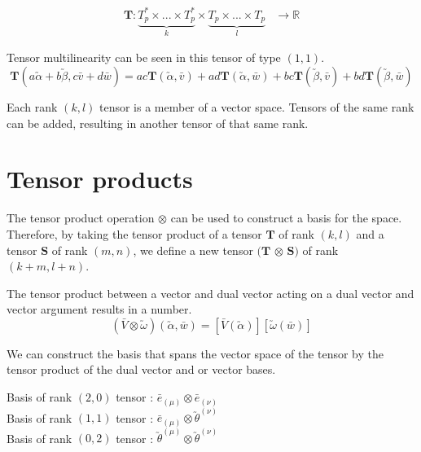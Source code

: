 \documentclass[11pt]{article}
\begin{document}
		\begin{equation}
		\begin{aligned}
		\boldsymbol{T} : \underbrace{T^{*} _{p} \times ... \times T^{*} _{p}}_{k} \times \underbrace{T_{p} \times ... \times T_{p}}_{l} &\to \mathbb{R}
		\end{aligned}
		\label{eq:mapping}
		\end{equation}
	\begin{example}
	Tensor multilinearity can be seen in this tensor of type $(1,1)$.
	\begin{equation}
	\boldsymbol{T}(a\utilde{\alpha} + b\utilde{\beta}, c\bar{v} + d\bar{w}) = ac\boldsymbol{T}(\utilde{\alpha}, \bar{v}) + ad\boldsymbol{T}(\utilde{\alpha}, \bar{w}) + bc\boldsymbol{T}(\utilde{\beta}, \bar{v}) + bd\boldsymbol{T}(\utilde{\beta}, \bar{w})
	\end{equation}
	\end{example}
		Each rank $(k,l)$ tensor is a member of a vector space. Tensors of the same rank can be added, resulting in another tensor of that same rank. 
	
	\newpage
	
	\section{Tensor products}\label{sec:class_style}
	
    The tensor product operation $\otimes$ can be used to construct a basis for the space. Therefore, by taking the tensor product of a tensor $\boldsymbol{T}$ of rank $(k,l)$ and a tensor $\boldsymbol{S}$ of rank $(m,n)$, we define a new tensor $(\boldsymbol{T}$ $\otimes$ $\boldsymbol{S})$ of rank $(k+m, l+n)$.
	\begin{example}
	The tensor product between a vector and dual vector acting on a dual vector and vector argument results in a number.
	\begin{equation}
	( \bar{V} \otimes\utilde{\omega}) (\utilde{\alpha}, \bar{w}) = [\bar{V}(\utilde{\alpha})][\utilde{\omega}(\bar{w})]
	\label{eq:TP1}
	\end{equation}
	\end{example}
	
	 We can construct the basis that spans the vector space of the tensor by the tensor product of the dual vector and or vector bases.
	\begin{example}
	Basis of rank $(2,0)$ tensor : $\bar{e}_{(\mu)} \otimes \bar{e}_{(\nu)}$\\
	Basis of rank $(1,1)$ tensor : $\bar{e}_{(\mu)} \otimes \utilde{\theta}^{(\nu)}$\\
	Basis of rank $(0,2)$ tensor : $\utilde{\theta}^{(\mu)} \otimes \utilde{\theta}^{(\nu)}$
	\end{example}
	
\end{document}
